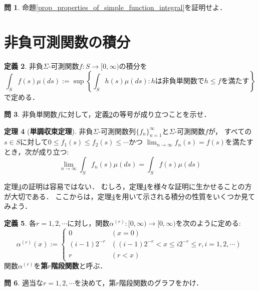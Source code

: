 \documentclass{jsreport}
\theoremstyle{definition}
\newtheorem{defi}{定義}[section]
\newtheorem{thm}[defi]{定理}
\newtheorem{qst}[defi]{問}
\begin{document}
\begin{qst}\label{qst_proof_of_properties_of_simple_function_integral}
命題\ref{prop_properties_of_simple_function_integral}を証明せよ．
\end{qst}

\section{非負可測関数の積分}

\begin{defi}\label{def_nonnegative_function_integral}
非負$\Sigma$-可測関数$f \colon S\to\mathbb[0,\infty)$の積分を
\[ \int_S f(s)\mu(ds):=\sup\left\{\int_Sh(s)\mu(ds):hは非負単関数でh \leq fを満たす\right\} \]
で定める．
\end{defi}

\begin{qst}\label{qst_nonnegative_function_integral_and_simple_function}
非負単関数$f$に対して，定義\ref{def_nonnegative_function_integral}の等号が成り立つことを示せ．
\end{qst}

\begin{thm}[\textbf{単調収束定理}]\label{monotone_convergence_theorem}
非負$\Sigma$-可測関数列$\{f_n\}_{n=1}^\infty$と$\Sigma$-可測関数$f$が，
すべての$s \in S$に対して$0 \leq f_1(s) \leq f_2(s) \leq\cdots$かつ
$\displaystyle\lim_{n\to\infty}f_n(s)=f(s)$を満たすとき，次が成り立つ:
\[ \lim_{n\to\infty}\int_S f_n(s)\mu(ds)=\int_S f(s)\mu(ds) \]
\end{thm}

定理\ref{monotone_convergence_theorem}の証明は容易ではない．
むしろ，定理\ref{monotone_convergence_theorem}を様々な証明に生かせることの方が大切である．
ここからは，定理\ref{monotone_convergence_theorem}を用いて示される積分の性質をいくつか見てみよう．

\begin{defi}\label{def_staircase_function}
各$r=1,2,\cdots$に対し，関数$\alpha^{(r)}\colon[0,\infty)\to[0,\infty)$を次のように定める:
\[ \alpha^{(r)}(x):=\begin{cases}
0 & (x=0) \\
(i-1)2^{-r} & ((i-1)2^{-r}<x \leq i2^{-r} \leq r, i=1,2,\cdots) \\
r & (r<x)
\end{cases} \]
関数$\alpha^{(r)}$を\textbf{第$r$階段関数}と呼ぶ．
\end{defi}

\begin{qst}\label{qst_staircase_function}
適当な$r=1,2,\cdots$を決めて，第$r$階段関数のグラフをかけ．
\end{qst}
\end{document}
